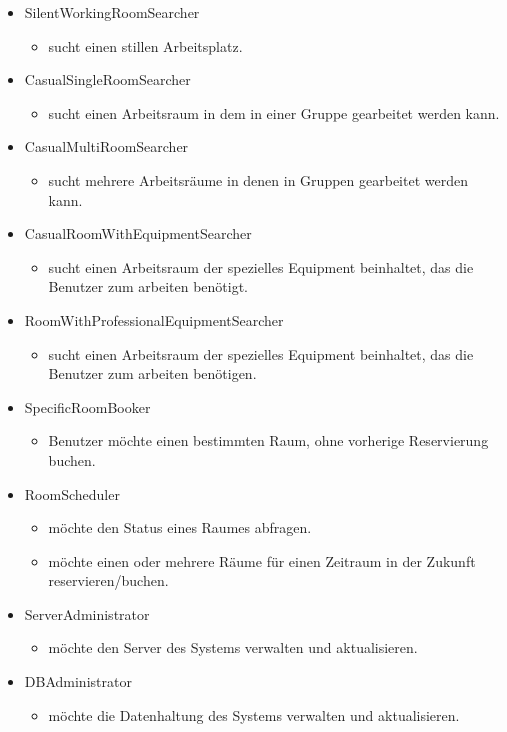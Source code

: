 \begin{itemize}
	\item SilentWorkingRoomSearcher
	\begin{itemize}
		\item sucht einen stillen Arbeitsplatz.
	\end{itemize}
	\item CasualSingleRoomSearcher
	\begin{itemize}
		\item sucht einen Arbeitsraum in dem in einer Gruppe gearbeitet werden kann.
	\end{itemize}
	\item CasualMultiRoomSearcher
	\begin{itemize}
		\item sucht mehrere Arbeitsräume in denen in Gruppen gearbeitet werden kann.
	\end{itemize}
	\item CasualRoomWithEquipmentSearcher
	\begin{itemize}
		\item sucht einen Arbeitsraum der spezielles Equipment beinhaltet, das die Benutzer zum arbeiten benötigt.
	\end{itemize}
	\item RoomWithProfessionalEquipmentSearcher
	\begin{itemize}
		\item sucht einen Arbeitsraum der spezielles Equipment beinhaltet, das die Benutzer zum arbeiten benötigen.
	\end{itemize}
	\item SpecificRoomBooker
	\begin{itemize}
		\item Benutzer möchte einen bestimmten Raum, ohne vorherige Reservierung buchen.
	\end{itemize}
	\item RoomScheduler
	\begin{itemize}
		\item möchte den Status eines Raumes abfragen.
		\item möchte einen oder mehrere Räume für einen Zeitraum in der Zukunft reservieren/buchen.
	\end{itemize}
	\item ServerAdministrator
	\begin{itemize}
		\item möchte den Server des Systems verwalten und aktualisieren.
	\end{itemize}
	\item DBAdministrator
	\begin{itemize}
		\item möchte die Datenhaltung des Systems verwalten und aktualisieren.
	\end{itemize}
	
\end{itemize}

